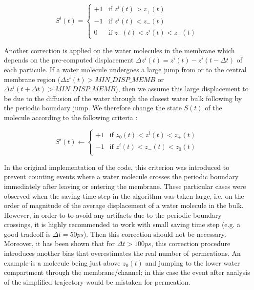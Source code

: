 \documentclass{article}
\begin{document}
\begin{equation}
S^i(t) = 
    \begin{cases} 
    +1 & \text{if } z^i(t) > z_+(t) \\ 
    -1 & \text{if } z^i(t) < z_-(t) \\ 
    0 & \text{if } z_-(t) < z^i(t) < z_+(t) 
    \end{cases}
\end{equation}

Another correction is applied on the water molecules in the membrane which depends on the pre-computed displacement $\Delta z^i(t) = z^i(t) - z^i(t-\Delta t)$ of each particule. If a water molecule undergoes a large jump from or to the central membrane region ($\Delta z^i(t) > MIN\_DISP\_MEMB$ or $\Delta z^i(t+\Delta t) > MIN\_DISP\_MEMB$), then we assume this large displacement to be due to the diffusion of the water through the closest water bulk following by the periodic boundary jump. We therefore change the state $S(t)$ of the molecule according to the following criteria :

\begin{equation}
    S^i(t) \gets 
        \begin{cases} 
        +1 & \text{if } z_0(t) < z^i(t) < z_+(t) \\ 
        -1 & \text{if } z^i(t) < z_-(t) < z_0(t) \\ 
        \end{cases}
    \end{equation}

In the original implementation of the code, this criterion was introduced to prevent counting events where a water molecule crosses the periodic boundary immediately after leaving or entering the membrane. These particular cases were observed when the saving time step in the algorithm was taken large, i.e. on the order of magnitude of the average displacement of a water molecule in the bulk. However, in order to to avoid any artifacts due to the periodic boundary crossings, it is highly recommended to work with small saving time step (e.g. a good tradeoff is $\Delta t = 50 ps$). Then this correction should not be necessary. Moreover, it has been shown that for $\Delta t > 100ps$, this correction procedure introduces another bias that overestimates the real number of permeations. An example is a molecule being just above $z_0(t)$ and jumping to the lower water compartment through the membrane/channel; in this case the event after analysis of the simplified trajectory would be mistaken for permeation.
\end{document}
